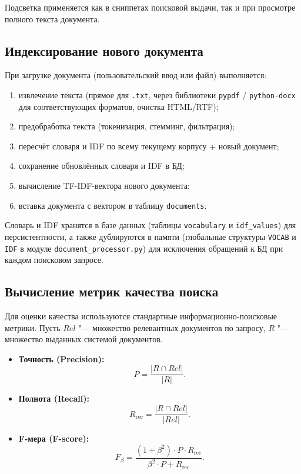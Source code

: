 Подсветка применяется как в сниппетах поисковой выдачи, так и при просмотре
полного текста документа.

\subsection{Индексирование нового документа}

При загрузке документа (пользовательский ввод или файл) выполняется:

\begin{enumerate}
	\item извлечение текста (прямое для \texttt{.txt}, через библиотеки
	      \texttt{pypdf} / \texttt{python-docx} для соответствующих форматов,
	      очистка HTML/RTF);
	\item предобработка текста (токенизация, стемминг, фильтрация);
	\item пересчёт словаря и IDF по всему текущему корпусу + новый документ;
	\item сохранение обновлённых словаря и IDF в БД;
	\item вычисление TF-IDF-вектора нового документа;
	\item вставка документа с вектором в таблицу \texttt{documents}.
\end{enumerate}

Словарь и IDF хранятся в базе данных (таблицы \texttt{vocabulary} и
\texttt{idf\_values}) для персистентности, а также дублируются в памяти
(глобальные структуры \texttt{VOCAB} и \texttt{IDF} в модуле
\texttt{document\_processor.py}) для исключения обращений к БД при каждом
поисковом запросе.

\subsection{Вычисление метрик качества поиска}

Для оценки качества используются стандартные информационно-поисковые метрики.
Пусть $Rel$ "--- множество релевантных документов по запросу, $R$ "--- множество
выданных системой документов.

\begin{itemize}
	\item \textbf{Точность (Precision):}
	\begin{equation}
		P = \frac{|R \cap Rel|}{|R|}.
		\label{eq:precision}
	\end{equation}
	\item \textbf{Полнота (Recall):}
	\begin{equation}
		R_{\text{rec}} = \frac{|R \cap Rel|}{|Rel|}.
		\label{eq:recall}
	\end{equation}
	\item \textbf{F-мера (F-score):}
	\begin{equation}
		F_{\beta} = \frac{(1 + \beta^{2}) \cdot P \cdot R_{\text{rec}}}
		                {\beta^{2} \cdot P + R_{\text{rec}}}.
		\label{eq:fscore}
	\end{equation}
\end{itemize}


